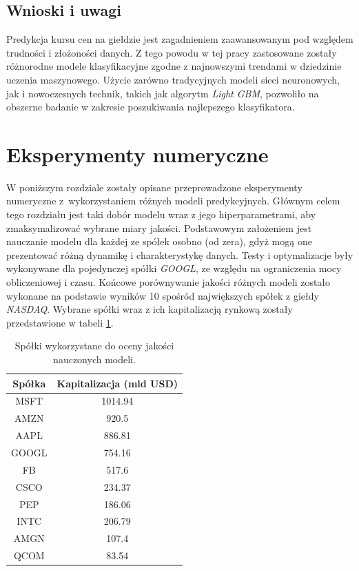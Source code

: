 \documentclass[a4paper, twoside, 11pt, openright]{article}
\begin{document}
\subsection{Wnioski i uwagi}

Predykcja kursu cen na giełdzie jest zagadnieniem zaawansowanym pod względem trudności i złożoności danych. Z tego powodu w tej pracy zastosowane zostały różnorodne modele klasyfikacyjne zgodne z najnowszymi trendami w dziedzinie uczenia maszynowego. Użycie zarówno tradycyjnych modeli sieci neuronowych, jak i nowoczesnych technik, takich jak algorytm \textit{Light GBM}, pozwoliło na obszerne badanie w zakresie poszukiwania najlepszego klasyfikatora.

\newpage

\section{Eksperymenty numeryczne}

W poniższym rozdziale zostały opisane przeprowadzone eksperymenty numeryczne z~wykorzystaniem różnych modeli predykcyjnych. Głównym celem tego rozdziału jest taki dobór modelu wraz z jego hiperparametrami, aby zmaksymalizować wybrane miary jakości. Podstawowym założeniem jest nauczanie modelu dla każdej ze spółek osobno (od zera), gdyż mogą one prezentować różną dynamikę i charakterystykę danych. Testy i optymalizacje były wykonywane dla pojedynczej spółki \textit{GOOGL}, ze względu na ograniczenia mocy obliczeniowej i czasu. Końcowe porównywanie jakości różnych modeli zostało wykonane na podstawie wyników 10 spośród największych spółek z giełdy \textit{NASDAQ}. Wybrane spółki wraz z ich kapitalizacją rynkową zostały przedstawione w tabeli \ref{tab:biggest_companies}.


\begin{table}[H]
    \centering
    \begin{tabular}{|c|c|}
    \hline
        \textbf{Spółka} & \textbf{Kapitalizacja (mld USD)} \\ \hline
        MSFT & 1014.94 \\ \hline 
        AMZN & 920.5 \\ \hline 
        AAPL & 886.81 \\ \hline 
        GOOGL & 754.16 \\ \hline 
        FB & 517.6 \\ \hline 
        CSCO & 234.37 \\ \hline 
        PEP & 186.06 \\ \hline 
        INTC & 206.79 \\ \hline 
        AMGN & 107.4 \\ \hline 
        QCOM & 83.54 \\ \hline 
    \end{tabular}
    \caption{Spółki wykorzystane do oceny jakości nauczonych modeli.}
    \label{tab:biggest_companies}
\end{table}
\end{document}

